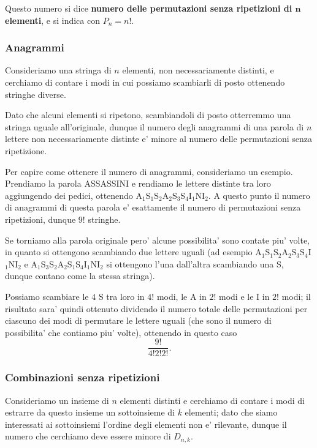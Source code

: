 Questo numero si dice \textbf{numero delle permutazioni senza ripetizioni di $\bm{n}$ elementi}, e si indica con $P_{n} = n!$.

\subsubsection{Anagrammi}

Consideriamo una stringa di $n$ elementi, non necessariamente distinti, e cerchiamo di contare i modi in cui possiamo scambiarli di posto ottenendo stringhe diverse.

Dato che alcuni elementi si ripetono, scambiandoli di posto otterremmo una stringa uguale all'originale, dunque il numero degli anagrammi di una parola di $n$ lettere non necessariamente distinte e' minore al numero delle permutazioni senza ripetizione.

Per capire come ottenere il numero di anagrammi, consideriamo un esempio. Prendiamo la parola ASSASSINI e rendiamo le lettere distinte tra loro aggiungendo dei pedici, ottenendo A$_1$S$_1$S$_2$A$_2$S$_3$S$_4$I$_1$NI$_2$. A questo punto il numero di anagrammi di questa parola e' esattamente il numero di permutazioni senza ripetizioni, dunque $9!$ stringhe. 

Se torniamo alla parola originale pero' alcune possibilita' sono contate piu' volte, in quanto si ottengono scambiando due lettere uguali (ad esempio A$_1$S$_1$S$_2$A$_2$S$_3$S$_4$I$_1$NI$_2$ e A$_1$S$_3$S$_2$A$_2$S$_1$S$_4$I$_1$NI$_2$ si ottengono l'una dall'altra scambiando una S, dunque contano come la stessa stringa). 

Possiamo scambiare le $4$ S tra loro in $4!$ modi, le A in $2!$ modi e le I in $2!$ modi; il risultato sara' quindi ottenuto dividendo il numero totale delle permutazioni per ciascuno dei modi di permutare le lettere uguali (che sono il numero di possibilita' che contiamo piu' volte), ottenendo in questo caso \[ 
    \frac{9!}{4!2!2!}
.\]

\subsubsection{Combinazioni senza ripetizioni}

Consideriamo un insieme di $n$ elementi distinti e cerchiamo di contare i modi di estrarre da questo insieme un sottoinsieme di $k$ elementi; dato che siamo interessati ai sottoinsiemi l'ordine degli elementi non e' rilevante, dunque il numero che cerchiamo deve essere minore di $D_{n, k}$.

